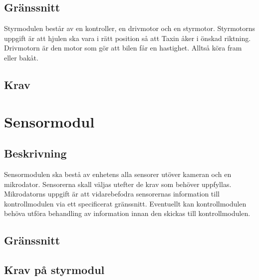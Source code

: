 \documentclass[kravspec/krav.tex]{subfiles}
\begin{document}
\subsection{Gränssnitt}
Styrmodulen består av en kontroller, en drivmotor och en styrmotor. Styrmotorns uppgift är att hjulen ska vara i rätt position så att Taxin åker i önskad riktning. Drivmotorn är den motor som gör att bilen får en hastighet. Alltså köra fram eller bakåt.
\subsection{Krav}
\begin{reqlist}
    \req{}
\end{reqlist}
\clearpage
\section{Sensormodul}
\subsection{Beskrivning}
Sensormodulen ska bestå av enhetens alla sensorer utöver kameran och en
mikrodator. Sensorerna skall väljas utefter de krav som behöver uppfyllas.
Mikrodatorns uppgift är att vidarebefodra sensorernas information till
kontrollmodulen via ett specificerat gränssnitt. Eventuellt kan kontrollmodulen
behöva utföra behandling av information innan den skickas till kontrollmodulen.

\subsection{Gränssnitt}
\subsection{Krav på styrmodul}
\end{document}
